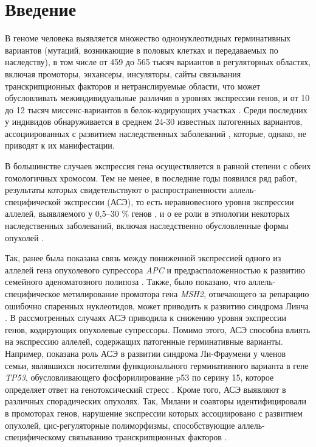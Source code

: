 \section{Введение}

В геноме человека выявляется множество однонуклеотидных герминативных вариантов (мутаций, возникающие в половых клетках и передаваемых по наследству), в том числе от 459 до 565 тысяч вариантов в регуляторных областях, включая промоторы, энхансеры, инсуляторы, сайты связывания транскрипционных факторов и нетранслируемые области, что может обусловливать межиндивидуальные различия в уровнях экспрессии генов, и от 10 до 12 тысяч миссенс-вариантов в белок-кодирующих участках \cite{1000_genomes_project_consortium_global_2015}. Среди последних у индивидов обнаруживается в среднем 24-30 известных патогенных вариантов, ассоциированных с развитием наследственных заболеваний \cite{1000_genomes_project_consortium_global_2015}, которые, однако, не приводят к их манифестации.

В большинстве случаев экспрессия гена осуществляется в равной степени с обеих гомологичных хромосом. Тем не менее, в последние годы появился ряд работ, результаты которых свидетельствуют о распространенности аллель-специфической экспрессии (АСЭ), то есть неравновесного уровня экспрессии аллелей, выявляемого у 0,5–30 \% генов \cite{gaur_research_2013, lappalainen_transcriptome_2013,li_detection_2013}, и о ее роли в этиологии некоторых наследственных заболеваний, включая наследственно обусловленные формы опухолей \cite{galiatsatos_familial_2006, chan_heritable_2006, buzby_allele-specific_2017}.

Так, ранее была показана связь между пониженной экспрессией одного из аллелей гена опухолевого супрессора \textit{APC} и предрасположенностью к развитию семейного аденоматозного полипоза \cite{galiatsatos_familial_2006}. Также, было показано, что аллель-специфическое метилирование промотора гена \textit{MSH2}, отвечающего за репарацию ошибочно спаренных нуклеотидов, может приводить к развитию синдрома Линча \cite{chan_heritable_2006}. В рассмотренных случаях АСЭ приводила к снижению уровня экспрессии генов, кодирующих опухолевые супрессоры. Помимо этого, АСЭ способна влиять на экспрессию аллелей, содержащих патогенные герминативные варианты. Например, показана роль АСЭ в развитии синдрома Ли-Фраумени у членов семьи, являвшихся носителями функционального герминативного варианта в гене \textit{TP53}, обусловливающего фосфорилирование p53 по серину 15, которое определяет ответ на генотоксический стресс \cite{buzby_allele-specific_2017}. Кроме того, АСЭ выявляют в различных спорадических опухолях. Так, Милани и соавторы идентифицировали в промоторах генов, нарушение экспрессии которых ассоциировано с развитием опухолей, цис-регуляторные полиморфизмы, способствующие аллель-специфическому связыванию транскрипционных факторов \cite{milani_allelic_2007}.

